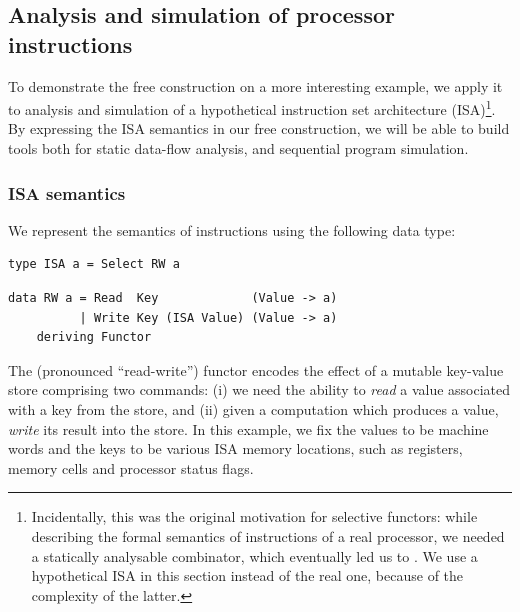 

\subsection{Analysis and simulation of processor instructions}\label{sec-free-isa}

To demonstrate the free construction on a more interesting example, we apply it
to analysis and simulation of a hypothetical instruction set architecture
(ISA)\footnote{Incidentally, this was the original motivation for selective
functors: while describing the formal semantics of instructions of a real
processor, we needed a statically analysable  combinator, which
eventually led us to . We use a hypothetical ISA in this section
instead of the real one, because of the complexity of the latter.}. By
expressing the ISA semantics in our free construction, we will be able to build
tools both for static data-flow analysis, and sequential program simulation.

\subsubsection{ISA semantics}

We represent the semantics of instructions using the following data type:

\vspace{1mm}
\begin{verbatim}
type ISA a = Select RW a
\end{verbatim}
\vspace{1mm}
\begin{verbatim}
data RW a = Read  Key             (Value -> a)
          | Write Key (ISA Value) (Value -> a)
    deriving Functor
\end{verbatim}
\vspace{1mm}

\noindent

The  (pronounced ``read-write'') functor encodes the effect of a mutable
key-value store comprising two commands: (i) we need the ability to \emph{read}
a value associated with a key from the store, and (ii) given a computation which
produces a value, \emph{write} its result into the store. In this example, we
fix the values to be machine words and the keys to be various ISA memory
locations, such as registers, memory cells and processor status flags.

